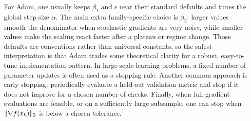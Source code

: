 For Adam, one usually keeps $\beta_1$ and $\epsilon$ near their standard defaults and tunes the global step size $\alpha$.
The main extra family-specific choice is $\beta_2$: larger values smooth the denominator when stochastic gradients are very noisy, while smaller values make the scaling react faster after a plateau or regime change.
Those defaults are conventions rather than universal constants, so the safest interpretation is that Adam trades some theoretical clarity for a robust, easy-to-tune implementation pattern.
In large-scale learning problems, a fixed number of parameter updates is often used as a stopping rule.
Another common approach is early stopping: periodically evaluate a held-out validation metric and stop if it does not improve for a chosen number of checks.
Finally, when full-gradient evaluations are feasible, or on a sufficiently large subsample, one can stop when $\lVert\nabla f(x_k)\rVert_2$ is below a chosen tolerance.
